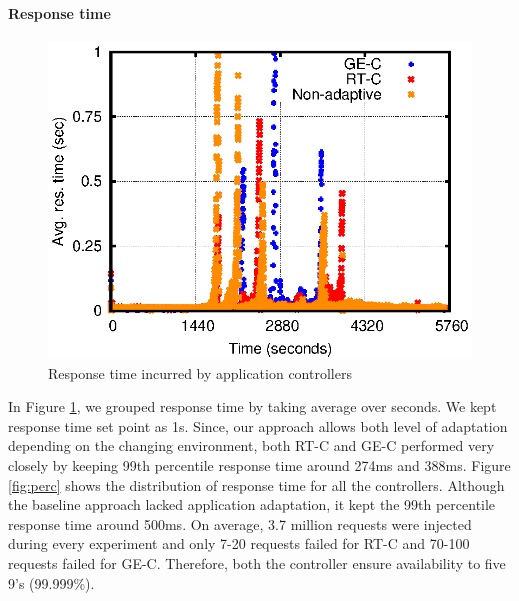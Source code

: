 
\paragraph*{\textbf{Response time}}
\begin{figure} [htb]
\centering
\includegraphics[scale=.85]{Graphs/responseTime.eps}
\caption{Response time incurred by application controllers}
\label{fig:rt}
\end{figure}
In Figure \ref{fig:rt}, we grouped response time by taking average over seconds. We kept response time set point as 1s. Since, our approach allows both level of adaptation depending on the changing environment, both RT-C and GE-C performed very closely by keeping 99th percentile response time around 274ms and 388ms. 
Figure \ref{fig:perc} shows the distribution of response time for all the controllers. 
Although the baseline approach lacked application adaptation, it kept the 99th percentile response time around 500ms. On average, 3.7 million requests were injected during every experiment and only 7-20 requests failed for RT-C and 70-100 requests failed for GE-C. Therefore, both the controller ensure availability to five 9's (99.999\%).


